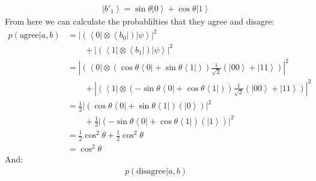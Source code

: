 \documentclass[12pt,a4]{article}
\begin{document}
\begin{enumerate}
\begin{enumerate}
\begin{align*}
          \left|b'_1\right\rangle = \sin \theta \left|0\right\rangle + \cos \theta \left|1\right\rangle
        \end{align*}
        From here we can calculate the probablilties that they agree and disagre:
        \begin{align*}
          p(\text{agree} | a, b) &= |(\left\langle 0 \right| \otimes \left\langle b_0 \right|)\left|\psi\right\rangle|^2\\
                                 &\qquad + |(\left\langle 1 \right| \otimes \left\langle b_1 \right|)\left|\psi\right\rangle|^2\\
                                 &= |(\left\langle 0 \right| \otimes (\cos \theta \left\langle 0\right| + \sin \theta \left\langle1\right|))\frac{1}{\sqrt{2}}\left(\left| 00 \right \rangle + \left|11\right \rangle\right)|^2\\
                                 &\qquad + |(\left\langle 1 \right| \otimes (-\sin\theta \left\langle 0\right| + \cos\theta \left\langle1\right|))\frac{1}{\sqrt{2}}\left(\left| 00 \right \rangle + \left|11\right \rangle\right)|^2\\
                                 &= \frac{1}{2}|(\cos \theta \left\langle 0\right| + \sin \theta \left\langle1\right|)\left(\left| 0 \right \rangle\right)|^2\\
                                 &\qquad + \frac{1}{2}|(-\sin\theta \left\langle 0\right| + \cos\theta \left\langle1\right|)\left(\left|1\right \rangle\right)|^2\\
                                 &= \frac{1}{2}\cos^2 \theta + \frac{1}{2}\cos^2 \theta \\
                                 &= \cos^2 \theta
        \end{align*}
        And:
        \begin{align*}
          p(\text{disagree} | a, b) 

\end{align*}
\end{enumerate}
\end{enumerate}
\end{document}
